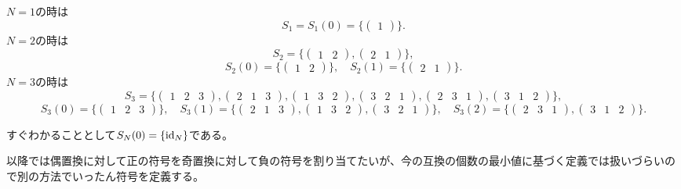 \begin{example}
$N = 1$の時は
$$
S_1 = S_1(0) = \{ \begin{pmatrix}1\end{pmatrix} \}.
$$
$N = 2$の時は
$$
S_2 = \{ \begin{pmatrix}1 & 2\end{pmatrix}, \begin{pmatrix}2 & 1\end{pmatrix} \},
$$
$$
S_2(0) = \{ \begin{pmatrix}1 & 2\end{pmatrix} \},
\quad S_2(1) = \{ \begin{pmatrix}2 & 1\end{pmatrix} \}.
$$
$N = 3$の時は
$$
S_3 = \{ \begin{pmatrix}1 & 2 & 3\end{pmatrix}, \begin{pmatrix}2 & 1 & 3\end{pmatrix}, \begin{pmatrix}1 & 3 & 2\end{pmatrix}, \begin{pmatrix}3 & 2 & 1\end{pmatrix}, \begin{pmatrix}2 & 3 & 1\end{pmatrix}, \begin{pmatrix}3 & 1 & 2\end{pmatrix} \},
$$
$$
S_3(0) = \{ \begin{pmatrix}1 & 2 & 3\end{pmatrix} \},
\quad S_3(1) = \{ \begin{pmatrix}2 & 1 & 3\end{pmatrix}, \begin{pmatrix}1 & 3 & 2\end{pmatrix}, \begin{pmatrix}3 & 2 & 1\end{pmatrix} \},
\quad S_3(2) = \{ \begin{pmatrix}2 & 3 & 1\end{pmatrix}, \begin{pmatrix}3 & 1 & 2\end{pmatrix} \}.
$$
\end{example}

すぐわかることとして$S_N(0) = \{ \mathrm{id}_N \}$である。

以降では偶置換に対して正の符号を奇置換に対して負の符号を割り当てたいが、今の互換の個数の最小値に基づく定義では扱いづらいので別の方法でいったん符号を定義する。

